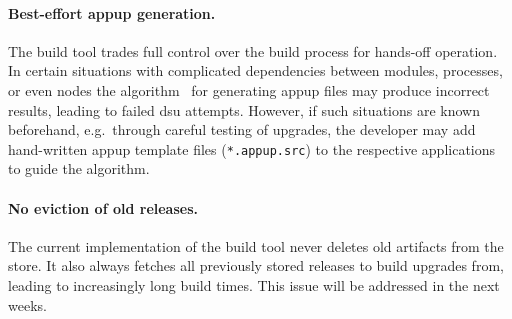 \paragraph{Best-effort \acrshort{appup} generation.} The build tool trades full control over the build process for hands-off operation. In certain situations with complicated dependencies between modules, processes, or even nodes the algorithm~\cite{rebar3appup}
for generating \acrfull{appup} files may produce incorrect results, leading to failed \acrshort{dsu} attempts. However, if such situations are known beforehand, e.g.~through careful testing of upgrades, the developer may add hand-written \acrshort{appup} template files (\lstinline|*.appup.src|) to the respective applications to guide the algorithm.

\paragraph{No eviction of old releases.} The current implementation of the build tool never deletes old artifacts from the store. It also always fetches all previously stored releases to build upgrades from, leading to increasingly long build times. This issue will be addressed in the next weeks.
